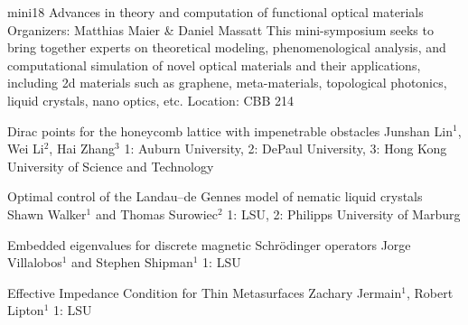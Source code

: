 \mini
{mini18}
{Advances in theory and computation of functional optical materials}
{Organizers: Matthias Maier \& Daniel Massatt}
{This mini-symposium seeks to bring together experts on theoretical modeling, phenomenological analysis, and computational simulation of novel optical materials and their applications, including 2d materials such as graphene, meta-materials, topological photonics, liquid crystals, nano optics, etc.}
{Location: CBB 214}

\begin{talks}
\item\talk
{Dirac points for the honeycomb lattice with impenetrable obstacles}
{Junshan Lin$^{1}$, Wei Li$^{2}$, Hai Zhang$^{3}$}
{1: Auburn University, 2: DePaul University, 3: Hong Kong University of Science and Technology}
\item\talk
{Optimal control of the Landau--de Gennes model of nematic liquid crystals}
{Shawn Walker$^{1}$ and Thomas Surowiec$^{2}$}
{1: LSU, 2: Philipps University of Marburg}
\item\talk
{Embedded eigenvalues for discrete magnetic Schrödinger operators}
{Jorge Villalobos$^{1}$ and Stephen Shipman$^{1}$}
{1: LSU}
\item\talk
{Effective Impedance Condition for Thin Metasurfaces}
{Zachary Jermain$^{1}$, Robert Lipton$^{1}$}
{1: LSU}
\end{talks}
\room
